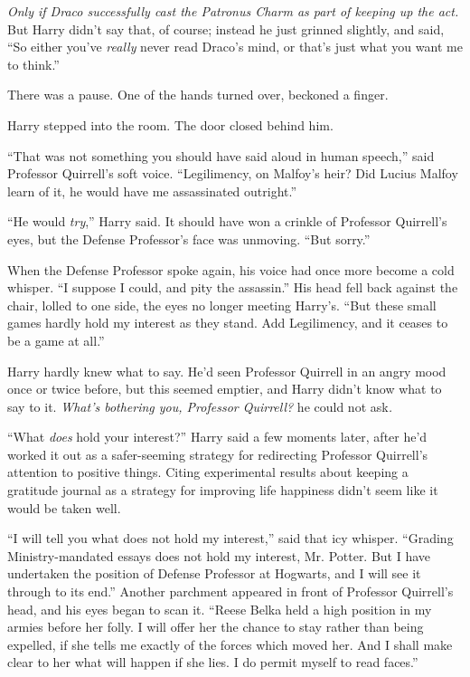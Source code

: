 \emph{Only if Draco successfully cast the Patronus Charm as part of keeping up the act.} But Harry didn't say that, of course; instead he just grinned slightly, and said, ``So either you've \emph{really} never read Draco's mind, or that's just what you want me to think.''

There was a pause. One of the hands turned over, beckoned a finger.

Harry stepped into the room. The door closed behind him.

``That was not something you should have said aloud in human speech,'' said Professor Quirrell's soft voice. ``Legilimency, on Malfoy's heir? Did Lucius Malfoy learn of it, he would have me assassinated outright.''

``He would \emph{try},'' Harry said. It should have won a crinkle of Professor Quirrell's eyes, but the Defense Professor's face was unmoving. ``But sorry.''

When the Defense Professor spoke again, his voice had once more become a cold whisper. ``I suppose I could, and pity the assassin.'' His head fell back against the chair, lolled to one side, the eyes no longer meeting Harry's. ``But these small games hardly hold my interest as they stand. Add Legilimency, and it ceases to be a game at all.''

Harry hardly knew what to say. He'd seen Professor Quirrell in an angry mood once or twice before, but this seemed emptier, and Harry didn't know what to say to it. \emph{What's bothering you, Professor Quirrell?} he could not ask\emph{.}

``What \emph{does} hold your interest?'' Harry said a few moments later, after he'd worked it out as a safer-seeming strategy for redirecting Professor Quirrell's attention to positive things. Citing experimental results about keeping a gratitude journal as a strategy for improving life happiness didn't seem like it would be taken well.

``I will tell you what does not hold my interest,'' said that icy whisper. ``Grading Ministry-mandated essays does not hold my interest, Mr. Potter. But I have undertaken the position of Defense Professor at Hogwarts, and I will see it through to its end.'' Another parchment appeared in front of Professor Quirrell's head, and his eyes began to scan it. ``Reese Belka held a high position in my armies before her folly. I will offer her the chance to stay rather than being expelled, if she tells me exactly of the forces which moved her. And I shall make clear to her what will happen if she lies. I do permit myself to read faces.''


